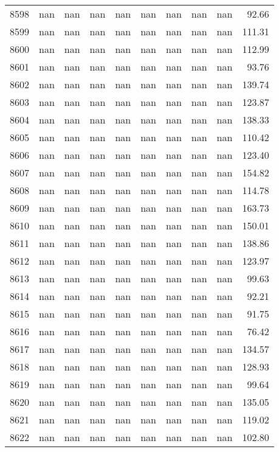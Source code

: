 \begin{tabular}{lrrrrrrrrr}
8598 & nan & nan & nan & nan & nan & nan & nan & nan & 92.66 \\
8599 & nan & nan & nan & nan & nan & nan & nan & nan & 111.31 \\
8600 & nan & nan & nan & nan & nan & nan & nan & nan & 112.99 \\
8601 & nan & nan & nan & nan & nan & nan & nan & nan & 93.76 \\
8602 & nan & nan & nan & nan & nan & nan & nan & nan & 139.74 \\
8603 & nan & nan & nan & nan & nan & nan & nan & nan & 123.87 \\
8604 & nan & nan & nan & nan & nan & nan & nan & nan & 138.33 \\
8605 & nan & nan & nan & nan & nan & nan & nan & nan & 110.42 \\
8606 & nan & nan & nan & nan & nan & nan & nan & nan & 123.40 \\
8607 & nan & nan & nan & nan & nan & nan & nan & nan & 154.82 \\
8608 & nan & nan & nan & nan & nan & nan & nan & nan & 114.78 \\
8609 & nan & nan & nan & nan & nan & nan & nan & nan & 163.73 \\
8610 & nan & nan & nan & nan & nan & nan & nan & nan & 150.01 \\
8611 & nan & nan & nan & nan & nan & nan & nan & nan & 138.86 \\
8612 & nan & nan & nan & nan & nan & nan & nan & nan & 123.97 \\
8613 & nan & nan & nan & nan & nan & nan & nan & nan & 99.63 \\
8614 & nan & nan & nan & nan & nan & nan & nan & nan & 92.21 \\
8615 & nan & nan & nan & nan & nan & nan & nan & nan & 91.75 \\
8616 & nan & nan & nan & nan & nan & nan & nan & nan & 76.42 \\
8617 & nan & nan & nan & nan & nan & nan & nan & nan & 134.57 \\
8618 & nan & nan & nan & nan & nan & nan & nan & nan & 128.93 \\
8619 & nan & nan & nan & nan & nan & nan & nan & nan & 99.64 \\
8620 & nan & nan & nan & nan & nan & nan & nan & nan & 135.05 \\
8621 & nan & nan & nan & nan & nan & nan & nan & nan & 119.02 \\
8622 & nan & nan & nan & nan & nan & nan & nan & nan & 102.80 \\

\end{tabular}
